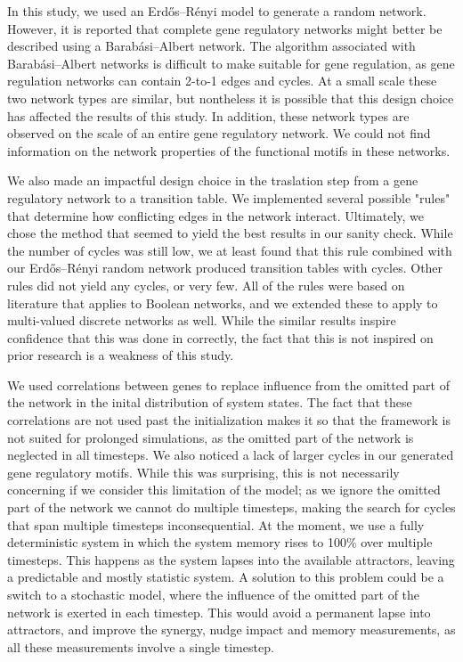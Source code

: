 \documentclass[../main.tex]{subfiles}
\begin{document}
In this study, we used an Erdős–Rényi model to generate a random network.
However, it is reported that complete gene regulatory networks might better be described using a Barabási–Albert network.
The algorithm associated with Barabási–Albert networks is difficult to make suitable for gene regulation, as gene regulation networks can contain 2-to-1 edges and cycles.
At a small scale these two network types are similar, but nontheless it is possible that this design choice has affected the results of this study.
In addition, these network types are observed on the scale of an entire gene regulatory network.
We could not find information on the network properties of the functional motifs in these networks.

We also made an impactful design choice in the traslation step from a gene regulatory network to a transition table.
We implemented several possible "rules" that determine how conflicting edges in the network interact.
Ultimately, we chose the method that seemed to yield the best results in our sanity check.
While the number of cycles was still low, we at least found that this rule combined with our Erdős–Rényi random network produced transition tables with cycles.
Other rules did not yield any cycles, or very few.
All of the rules were based on literature that applies to Boolean networks, and we extended these to apply to multi-valued discrete networks as well.
While the similar results inspire confidence that this was done in correctly, the fact that this is not inspired on prior research is a weakness of this study.

We used correlations between genes to replace influence from the omitted part of the network in the inital distribution of system states.
The fact that these correlations are not used past the initialization makes it so that the framework is not suited for prolonged simulations, as the omitted part of the network is neglected in all timesteps.
We also noticed a lack of larger cycles in our generated gene regulatory motifs. %
While this was surprising, this is not necessarily concerning if we consider this limitation of the model; as we ignore the omitted part of the network we cannot do multiple timesteps, making the search for cycles that span multiple timesteps inconsequential. 
At the moment, we use a fully deterministic system in which the system memory rises to 100\% over multiple timesteps.
This happens as the system lapses into the available attractors, leaving a predictable and mostly statistic system.
A solution to this problem could be a switch to a stochastic model, where the influence of the omitted part of the network is exerted in each timestep.
This would avoid a permanent lapse into attractors, and improve the synergy, nudge impact and memory measurements, as all these measurements involve a single timestep.
\end{document}
